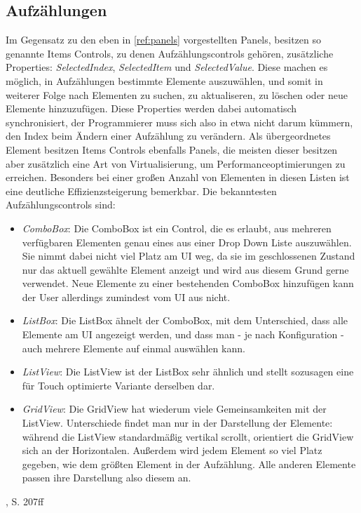 \documentclass[a4paper,bibtotoc,oneside]{scrbook}
\begin{document}
\subsection[Aufzählungen]{Aufzählungen}
Im Gegensatz zu den eben in \ref{ref:panels} vorgestellten Panels, besitzen so genannte Items Controls, zu denen Aufzählungscontrols gehören, zusätzliche Properties: \textit{SelectedIndex}, \textit{SelectedItem} und \textit{SelectedValue}. Diese machen es möglich, in Aufzählungen bestimmte Elemente auszuwählen, und somit in weiterer Folge nach Elementen zu suchen, zu aktualiseren, zu löschen oder neue Elemente hinzuzufügen.
\newline
Diese Properties werden dabei automatisch synchronisiert, der Programmierer muss sich also in etwa nicht darum kümmern, den Index beim Ändern einer Aufzählung zu verändern.
\newline
\newline
Als übergeordnetes Element besitzen Items Controls ebenfalls Panels, die meisten dieser besitzen aber zusätzlich eine Art von Virtualisierung, um Performanceoptimierungen zu erreichen. Besonders bei einer großen Anzahl von Elementen in diesen Listen ist eine deutliche Effizienzsteigerung bemerkbar.
\newline
\newline
Die bekanntesten Aufzählungscontrols sind:
\begin{itemize}
\item \textit{ComboBox}: Die ComboBox ist ein Control, die es erlaubt, aus mehreren verfügbaren Elementen genau eines aus einer Drop Down Liste auszuwählen. Sie nimmt dabei nicht viel Platz am UI weg, da sie im geschlossenen Zustand nur das aktuell gewählte Element anzeigt und wird aus diesem Grund gerne verwendet. Neue Elemente zu einer bestehenden ComboBox hinzufügen kann der User allerdings zumindest vom UI aus nicht.
\newline
\item \textit{ListBox}: Die ListBox ähnelt der ComboBox, mit dem Unterschied, dass alle Elemente am UI angezeigt werden, und dass man - je nach Konfiguration - auch mehrere Elemente auf einmal auswählen kann.
\newline
\item \textit{ListView}: Die ListView ist der ListBox sehr ähnlich und stellt sozusagen eine für Touch optimierte Variante derselben dar.
\newline
\item \textit{GridView}: Die GridView hat wiederum viele Gemeinsamkeiten mit der ListView. Unterschiede findet man nur in der Darstellung der Elemente: während die ListView standardmäßig vertikal scrollt, orientiert die GridView sich an der Horizontalen. Außerdem wird jedem Element so viel Platz gegeben, wie dem größten Element in der Aufzählung. Alle anderen Elemente passen ihre Darstellung also diesem an.
\end{itemize}
 \cite{ana12}, S. 207ff
\end{document}
